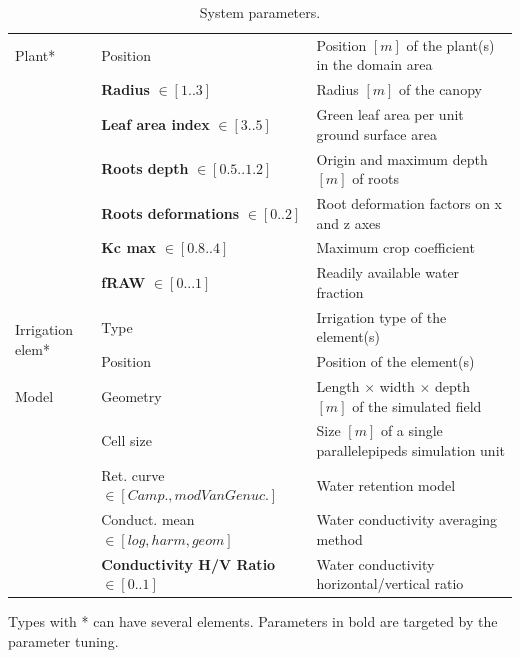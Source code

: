 \begin{table}[H]
\begin{tabular}{p{1.2cm}p{5cm}p{7.5cm}}
		\hline%
		Plant* & Position & Position $[m]$ of the plant(s) in the domain area\\
		& \textbf{Radius} $\in [1..3]$ & Radius $[m]$ of the canopy \\
		& \textbf{Leaf area index} $\in [3..5]$ & Green leaf area per unit ground surface area\\ %
		& \textbf{Roots depth} $\in [0.5..1.2]$ &  Origin and maximum depth $[m]$ of roots\\
		& \textbf{Roots deformations} $\in [0..2]$ &  Root deformation factors on x and z axes\\ 
		& \textbf{Kc max} $\in [0.8..4]$ &  Maximum crop coefficient\\
		& \textbf{fRAW} $\in [0...1]$ & Readily available water fraction\\
		\hline%
		\multirow{2}{1cm}{Irrigation elem*} & Type & Irrigation type of the element(s) \\
		& Position & Position of the element(s)\\
		\hline%
		Model & Geometry  & Length $\times$ width $\times$ depth $[m]$ of the simulated field\\
		& Cell size  &  Size $[m]$ of a single parallelepipeds simulation unit\\%
		& Ret. curve $\in [Camp., mod Van Genuc.]$ & Water retention model\\ 
	    & Conduct. mean $\in [log, harm, geom]$ &  Water conductivity averaging method \\ %
		& \textbf{Conductivity H/V Ratio} $\in [0..1]$  &  Water conductivity horizontal/vertical ratio \\
		\bottomrule
	\end{tabular}%
	\begin{tablenotes}
      \scriptsize
      \item Types with * can have several elements. Parameters in bold are targeted by the parameter tuning.
    \end{tablenotes}
	\caption{System parameters.}
	\label{tab:parameter}%
\end{table}%

